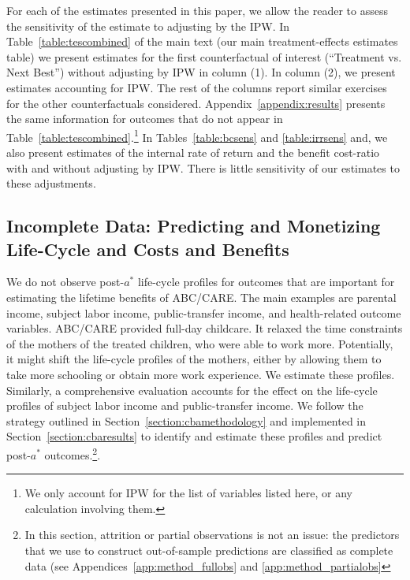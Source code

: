 \noindent For each of the estimates presented in this paper, we allow the reader to assess the sensitivity of the estimate to adjusting by the IPW. In Table~\ref{table:tescombined} of the main text (our main treatment-effects estimates table) we present estimates for the first counterfactual of interest (``Treatment vs. Next Best'') without adjusting by IPW in column (1). In column (2), we present estimates accounting for IPW. The rest of the columns report similar exercises for the other counterfactuals considered. Appendix~\ref{appendix:results} presents the same information for outcomes that do not appear in Table~\ref{table:tescombined}.\footnote{We only account for IPW for the list of variables listed here, or any calculation involving them.} In Tables~\ref{table:bcsens} and \ref{table:irrsens} and, we also present estimates of the internal rate of return and the benefit cost-ratio with and without adjusting by IPW. There is little sensitivity of our estimates to these adjustments.

\subsection{Incomplete Data: Predicting and Monetizing Life-Cycle and Costs and Benefits} \label{appendix:incomplete}
\label{app:method_noobs}

\noindent We do not observe post-$a^*$ life-cycle profiles for outcomes that are important for estimating the lifetime benefits of ABC/CARE. The main examples are parental income, subject labor income, public-transfer income, and health-related outcome variables. ABC/CARE provided full-day childcare. It relaxed the time constraints of the mothers of the treated children, who were able to work more. Potentially, it might shift the life-cycle profiles of the mothers, either by allowing them to take more schooling or obtain more work experience. We estimate these profiles. Similarly, a comprehensive evaluation accounts for the effect on the life-cycle profiles of subject labor income and public-transfer income. We follow the strategy outlined in Section~\ref{section:cbamethodology} and implemented in Section~\ref{section:cbaresults} to identify and estimate these profiles and predict post-$a^\ast$ outcomes.\footnote{In this section, attrition or partial observations is not an issue: the predictors that we use to construct out-of-sample predictions are classified as complete data (see Appendices~\ref{app:method_fullobs} and \ref{app:method_partialobs}}.\\

